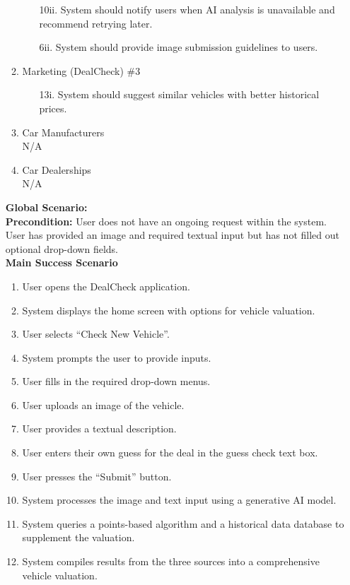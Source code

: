 \documentclass[]{article}
\begin{document}
\begin{enumerate}[{\bf {BE}1.}]
\begin{enumerate}[{\bf VP1.}]
\begin{enumerate}
          \item[10ii.] System should notify users when AI analysis is unavailable and recommend retrying later.
          \item[6ii.] System should provide image submission guidelines to users.
        \end{enumerate}
      \item Marketing (DealCheck) \#3
        \begin{enumerate}
          \item[13i.] System should suggest similar vehicles with better historical prices.
        \end{enumerate}
      \item Car Manufacturers \\ N/A
      \item Car Dealerships \\ N/A
    \end{enumerate}
    {\bf Global Scenario:}\\
    \textbf{Precondition:} User does not have an ongoing request within the system. User has provided an image and required textual input but has not filled out optional drop-down fields.\\
    \textbf{Main Success Scenario}
    \begin{enumerate}[1.]
      \item User opens the DealCheck application.
      \item System displays the home screen with options for vehicle valuation.
      \item User selects ``Check New Vehicle''.
      \item System prompts the user to provide inputs.
      \item User fills in the required drop-down menus.
      \item User uploads an image of the vehicle.
      \item User provides a textual description.
      \item User enters their own guess for the deal in the guess check text box.
      \item User presses the ``Submit'' button.
      \item System processes the image and text input using a generative AI model.
      \item System queries a points-based algorithm and a historical data database to supplement the valuation.
      \item System compiles results from the three sources into a comprehensive vehicle valuation.

\end{enumerate}
\end{enumerate}
\end{document}
